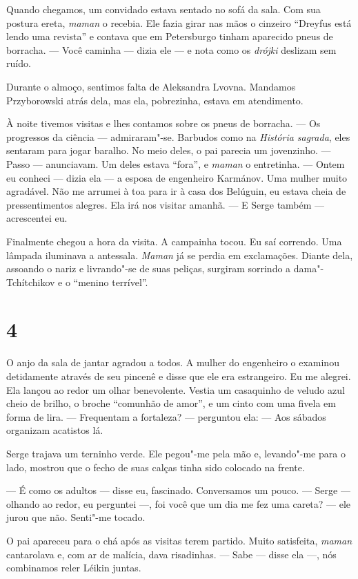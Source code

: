 Quando chegamos, um convidado estava sentado no sofá da sala. Com sua
postura ereta, \emph{maman} o recebia. Ele fazia girar nas mãos o
cinzeiro ``Dreyfus está lendo uma revista'' e contava que em Petersburgo
tinham aparecido pneus de borracha. --- Você caminha --- dizia ele --- e
nota como os \emph{drójki} deslizam sem ruído.

Durante o almoço, sentimos falta de Aleksandra Lvovna. Mandamos
Przyborowski atrás dela, mas ela, pobrezinha, estava em atendimento.

À noite tivemos visitas e lhes contamos sobre os pneus de borracha. ---
Os progressos da ciência --- admiraram"-se. Barbudos como na
\emph{História sagrada}, eles sentaram para jogar baralho. No meio
deles, o pai parecia um jovenzinho. --- Passo --- anunciavam. Um deles
estava ``fora'', e \emph{maman} o entretinha. --- Ontem eu conheci ---
dizia ela --- a esposa de engenheiro Karmánov. Uma mulher muito
agradável. Não me arrumei à toa para ir à casa dos Belúguin, eu estava
cheia de pressentimentos alegres. Ela irá nos visitar amanhã. --- E
Serge também --- acrescentei eu.

Finalmente chegou a hora da visita. A campainha tocou. Eu saí correndo.
Uma lâmpada iluminava a antessala. \emph{Maman} já se perdia em
exclamações. Diante dela, assoando o nariz e livrando"-se de suas
peliças, surgiram sorrindo a dama"-Tchítchikov e o ``menino terrível''.

\section{4}

O anjo da sala de jantar agradou a todos. A mulher do engenheiro o
examinou detidamente através de seu pincenê e disse que ele era
estrangeiro. Eu me alegrei. Ela lançou ao redor um olhar benevolente.
Vestia um casaquinho de veludo azul cheio de brilho, o broche ``comunhão
de amor'', e um cinto com uma fivela em forma de lira. --- Frequentam a
fortaleza? --- perguntou ela: --- Aos sábados organizam acatistos lá.

Serge trajava um terninho verde. Ele pegou"-me pela mão e, levando"-me
para o lado, mostrou que o fecho de suas calças tinha sido colocado na
frente.

--- É como os adultos --- disse eu, fascinado. Conversamos um pouco. ---
Serge --- olhando ao redor, eu perguntei ---, foi você que um dia me fez
uma careta? --- ele jurou que não. Senti"-me tocado.

O pai apareceu para o chá após as visitas terem partido. Muito
satisfeita, \emph{maman} cantarolava e, com ar de malícia, dava
risadinhas. --- Sabe --- disse ela ---, nós combinamos reler Léikin
juntas.

